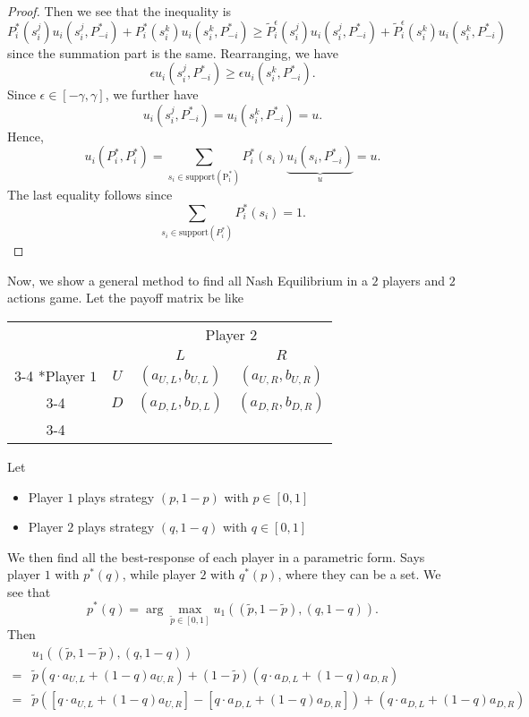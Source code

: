 \begin{proof}
	Then we see that the inequality is
	\[
		P_{i}^{\ast}(s_{i}^j)u_{i}(s_{i}^j, P_{-i}^{\ast})+ P_{i}^{\ast}(s_{i}^k)u_{i}(s_{i}^k, P_{-i}^{\ast})\geq \widetilde{P}_{i}^{\epsilon}(s_{i}^j)u_{i}(s_{i}^j, P^{\ast}_{-i})+\widetilde{P}_{i}^{\epsilon}(s_{i}^k)u_{i}(s_{i}^k, P^{\ast}_{-i})
	\]
	since the summation part is the same. Rearranging, we have
	\[
		\epsilon u_{i}(s_{i}^j, P^{\ast}_{-i})\geq \epsilon u_{i}(s_{i}^k, P^{\ast}_{-i}).
	\]
	Since \(\epsilon\in\left[-\gamma, \gamma\right]\), we further have
	\[
		u_{i}(s_{i}^j, P^{\ast}_{-i}) = u_{i}(s_{i}^k, P^{\ast}_{-i}) = u.
	\]
	Hence,
	\[
		u_{i}(P^{\ast}_{i}, P^{\ast}_{i}) = \sum\limits_{s_{i}\in \mathrm{\text{support}(P^{\ast}_{i})} }P^{\ast}_{i}(s_{i})\underbrace{u_{i}(s_{i}, P^{\ast}_{-i})}_{u} = u.
	\]
	The last equality follows since
	\[
		\sum\limits_{s_{i}\in \mathrm{support}(P^{\ast}_i) } P_{i}^{\ast}(s_{i}) = 1.
	\]
\end{proof}

Now, we show a general method to find all Nash Equilibrium in a \(2\) players and \(2\) actions game. Let the payoff matrix be like
\begin{table}[H]
	\centering
	\setlength{\extrarowheight}{2pt}
	\begin{tabular}{cc|c|c|}
		                          & \multicolumn{1}{c}{} & \multicolumn{2}{c}{Player $2$}                           \\
		                          & \multicolumn{1}{c}{} & \multicolumn{1}{c}{$L$}        & \multicolumn{1}{c}{$R$} \\\cline{3-4}
		\multirow{2}*{Player $1$} & $U$                  & $(a_{U, L}, b_{U, L})$         & $(a_{U, R}, b_{U, R})$  \\\cline{3-4}
		                          & $D$                  & $(a_{D, L}, b_{D, L})$         & $(a_{D, R}, b_{D, R})$  \\\cline{3-4}
	\end{tabular}
\end{table}
Let
\begin{itemize}
	\item Player \(1\) plays strategy \((p, 1 - p)\) with \(p\in \left[0, 1\right]\)
	\item Player \(2\) plays strategy \((q, 1 - q)\) with \(q\in \left[0, 1\right]\)
\end{itemize}

We then find all the best-response of each player in a parametric form.
Says player \(1\) with \(p^{\ast}(q)\), while player \(2\) with \(q^{\ast}(p)\), where they can be a set. We see that
\[
	p^{\ast}(q) = \arg\max_{\widetilde{p}\in\left[0, 1\right]}u_1\left((\widetilde{p}, 1 - \widetilde{p}), (q, 1 - q)\right).
\]
Then
\[
	\begin{split}
		&u_1\left((\widetilde{p}, 1 - \widetilde{p}), (q, 1 - q)\right) \\
		= &\widetilde{p}\left(q\cdot a_{U, L} + (1 - q)a_{U, R}\right)+(1 - \widetilde{p})\left(q\cdot a_{D, L}+(1 - q)a_{D, R}\right)\\
		= &\widetilde{p}\left(\left[q\cdot a_{U, L}+(1 - q)a_{U, R}\right] - \left[q\cdot a_{D, L} + (1 - q)a_{D, R}\right]\right)+\left(q\cdot a_{D, L}+(1 - q)a_{D, R}\right)
	\end{split}
\]

